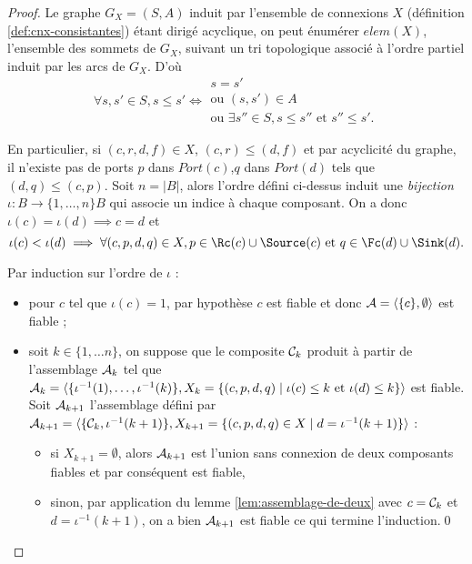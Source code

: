 \begin{proof}
    Le graphe $G_X=(S,A)$ induit par l'ensemble de connexions $X$
    (d\'efinition \ref{def:cnx-consistantes}) \'etant dirig\'e
    acyclique, on peut \'enum\'erer $elem(X)$, l'ensemble des
    sommets de $G_X$, suivant un tri topologique associ\'e \`a
    l'ordre partiel induit par les arcs de $G_X$. D'o\`u 
    $$
    \forall s,s' \in S, s\leq s' \Leftrightarrow 
    \begin{array}{l}
s = s' \\
\mbox{ou~} (s,s')\in A \\
\mbox{ou~} \exists s''\in S, s\leq s'' \mbox{~et~} s''\leq s'.
    \end{array}
    $$
    
    En particulier, si $(c,r,d,f)\in X$, $(c,r)\leq (d,f)$  et par
    acyclicit\'e du graphe, il n'existe pas de ports $p$ dans
    $Port(c)$,$q$ dans $Port(d)$ tels que  $(d,q)\leq (c,p)$. 
    Soit $n=\vert B\vert$, alors l'ordre
    d\'efini ci-dessus induit une \emph{bijection} $\iota:B
    \rightarrow \{1,\dots,n\}B$ qui associe un indice \`a chaque composant. On a
    donc $\iota(c)=\iota(d) \implies c= d$ et 
    $$
    \iota(c)< \iota(d) \implies 
    \forall (c,p,d,q)\in X, p\in \Rc(c)\cup \Source(c) \mbox{~et~} q\in
    \Fc(d)\cup \Sink(d).
    $$

    Par induction sur l'ordre de $\iota$ :
    \begin{itemize}
      \item pour $c$ tel que $\iota(c) = 1$, par hypoth\`ese $c$ est
        fiable et donc ${\cal
          A} = \langle \{c\},\emptyset \rangle$ est fiable ;
      \item soit $k\in \{1,\dots n\}$, on suppose que le composite  ${\cal C}_k$
      produit \`a partir de l'assemblage ${\cal A}_k$  tel que ${\cal A}_k = \langle
      \{\iota^{-1}(1),\dots,\iota^{-1}(k) \}, X_k=\{(c,p,d,q)\mid \iota(c)\leq k
      \mbox{~et~} \iota(d)\leq k\}\rangle$ est fiable. Soit ${\cal
      A}_{k+1}$ l'assemblage d\'efini par ${\cal A}_{k+1} = \langle
      \{{\cal C}_k,\iota^{-1}(k+1)\}, X_{k+1}=\{(c,p,d,q)\in X
      \mid d=\iota^{-1}(k+1)\}\rangle$ :
      \begin{itemize}
        \item si $X_{k+1} = \emptyset$, alors ${\cal A}_{k+1}$ est
        l'union sans connexion de deux composants fiables et par
        cons\'equent est fiable,
      \item sinon, par application du lemme
        \ref{lem:assemblage-de-deux} avec $c={\cal C}_k$ et
        $d=\iota^{-1}(k+1)$, on a bien ${\cal A}_{k+1}$ est fiable ce qui
        termine l'induction.\hfill\qed
      \end{itemize}
    \end{itemize}
\end{proof}


